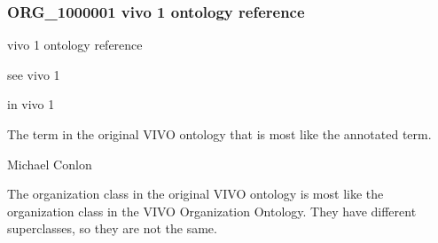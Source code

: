 \documentclass[letterpaper,10pt,english]{sphinxmanual}
\begin{document}
\subsubsection{ORG\_1000001 \sphinxhyphen{} vivo 1 ontology reference}
\label{\detokenize{doc-ORG_1000001:org-1000001-vivo-1-ontology-reference}}\label{\detokenize{doc-ORG_1000001:index-0}}\label{\detokenize{doc-ORG_1000001::doc}}
\begin{sphinxShadowBox}

\sphinxAtStartPar
vivo 1 ontology reference
\end{sphinxShadowBox}

\begin{sphinxShadowBox}

\sphinxAtStartPar
see vivo 1
\end{sphinxShadowBox}

\begin{sphinxShadowBox}

\sphinxAtStartPar
in vivo 1
\end{sphinxShadowBox}

\begin{sphinxShadowBox}

\sphinxAtStartPar
The term in the original VIVO ontology that is most like the annotated term.
\end{sphinxShadowBox}

\begin{sphinxShadowBox}

\sphinxAtStartPar
Michael Conlon 
\end{sphinxShadowBox}

\begin{sphinxShadowBox}

\sphinxAtStartPar
{}
\end{sphinxShadowBox}

\begin{sphinxShadowBox}

\sphinxAtStartPar
The organization class in the original VIVO ontology is most like the organization class in the VIVO Organization Ontology.  They have different superclasses, so they are not the same.
\end{sphinxShadowBox}
\end{document}
